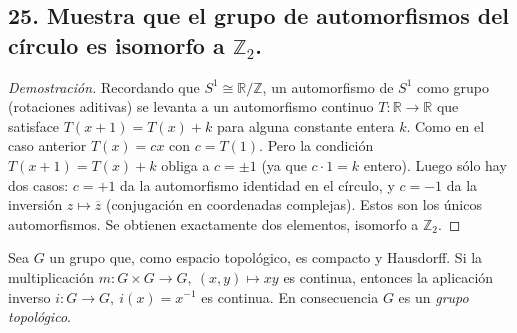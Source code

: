 \documentclass{article}
\begin{document}
\subsection*{25. Muestra que el grupo de automorfismos del círculo es isomorfo a $\mathbb{Z}_2$.}

\begin{proof}[Demostración]
Recordando que $S^1\cong \mathbb{R}/\mathbb{Z}$, un automorfismo de $S^1$ como grupo (rotaciones aditivas) se levanta a un automorfismo continuo $T:\mathbb{R}\to \mathbb{R}$ que satisface $T(x+1)=T(x)+k$ para alguna constante entera $k$. Como en el caso anterior $T(x)=cx$ con $c=T(1)$. Pero la condición $T(x+1)=T(x)+k$ obliga a $c=\pm1$ (ya que $c\cdot 1=k$ entero). Luego sólo hay dos casos: $c=+1$ da la automorfismo identidad en el círculo, y $c=-1$ da la inversión $z\mapsto \overline{z}$ (conjugación en coordenadas complejas). Estos son los únicos automorfismos. Se obtienen exactamente dos elementos, isomorfo a $\mathbb{Z}_2$. 
\end{proof}


\begin{theorem}
Sea \(G\) un grupo que, como espacio topológico, es compacto y Hausdorff.
Si la multiplicación \(m:G\times G\to G,\ (x,y)\mapsto xy\) es continua, entonces
la aplicación inverso \(i:G\to G,\ i(x)=x^{-1}\) es continua.  
En consecuencia \(G\) es un \emph{grupo topológico}.
\end{theorem}
\end{document}
